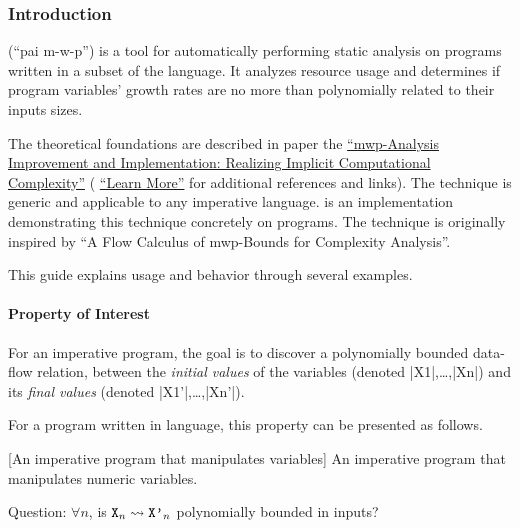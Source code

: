 \subsubsection{Introduction}
\label{guide-introduction}

 (\enquote{pai m-w-p}) is a tool for automatically performing static
analysis on programs written in a subset of the  language. It analyzes
resource usage and determines if program variables' growth rates are no more
than polynomially related to their inputs sizes.

The theoretical foundations are described in paper the
\hyperref[sec:fscd]{\enquote{mwp-Analysis Improvement and Implementation:
Realizing Implicit Computational Complexity}} (\cf
\hyperref[guide-learn-more]{\enquote{Learn More}} for additional references and
links). The technique is generic and applicable to any imperative
language.  is an implementation
demonstrating this technique concretely on  programs. The technique is
originally inspired by \enquote{A Flow Calculus of mwp-Bounds for Complexity
Analysis}.

This guide explains  usage and behavior through several examples.

\paragraph*{Property of Interest}

For an imperative program, the goal is to discover a polynomially bounded
data-flow relation, between the \emph{initial values}
of the variables (denoted \pr|X1|,\ldots{},\pr|Xn|) and its \emph{final values}
(denoted \pr|X1'|,\ldots{},\pr|Xn'|).

For a program written in  language, this property can be presented as
follows.

\begin{center}
\begin{minipage}{\textwidth}
\captionsetup{type=lstlisting}
[An imperative program that manipulates variables]
{An imperative program that manipulates numeric variables.}
\label{lst:guide}
\end{minipage}
\end{center}

Question: \(\forall n\), is \(\prm{X}_n \rightsquigarrow \prm{X'}_n\)
 polynomially bounded in inputs?


